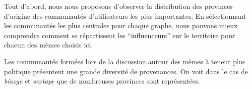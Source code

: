 Tout d{\textquoteright}abord, nous nous proposons
d{\textquoteright}observer la distribution des provinces
d{\textquoteright}origine des communaut\'es
d{\textquoteright}utilisateurs les plus importantes. En s\'electionnant
les communaut\'es les plus centrales pour chaque graphe, nous pouvons
mieux comprendre comment se r\'epartissent les
{\textquotedblleft}influenceurs{\textquotedblright} sur le territoire
pour chacun des m\`emes choisis ici.

\begin{figure}
    \centering

     
   

    \caption{
    }

\end{figure}

 

Les communaut\'es form\'ees lors de la discussion autour des m\`emes \`a
teneur plus politique pr\'esentent une grande diversit\'e de
provenances. On voit dans le cas de \textit{biaoge} et \textit{sextape
}que de nombreuses provinces sont repr\'esent\'ees. 


